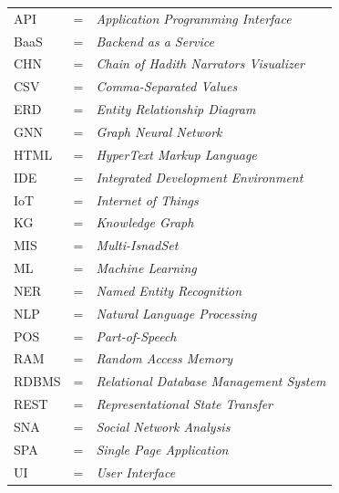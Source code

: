 \begin{tabular}{lp{0.5cm}l}
	API		& = & \textit{Application Programming Interface} \\
	BaaS	& = & \textit{Backend as a Service} \\
	CHN		& = & \textit{Chain of Hadith Narrators Visualizer} \\
	CSV		& = & \textit{Comma-Separated Values} \\
	ERD		& = & \textit{Entity Relationship Diagram} \\
	GNN		& = & \textit{Graph Neural Network} \\
	HTML	& = & \textit{HyperText Markup Language} \\
	IDE		& = & \textit{Integrated Development Environment} \\
	IoT		& = & \textit{Internet of Things} \\
	KG		& = & \textit{Knowledge Graph} \\
	MIS		& = & \textit{Multi-IsnadSet} \\
	ML		& = & \textit{Machine Learning} \\
	NER		& = & \textit{Named Entity Recognition} \\
	NLP		& = & \textit{Natural Language Processing} \\
	POS		& = & \textit{Part-of-Speech} \\
	RAM		& = & \textit{Random Access Memory} \\
	RDBMS	& = & \textit{Relational Database Management System} \\
	REST	& = & \textit{Representational State Transfer} \\
	SNA		& = & \textit{Social Network Analysis} \\
	SPA		& = & \textit{Single Page Application} \\
	UI		& = & \textit{User Interface} \\
\end{tabular}
